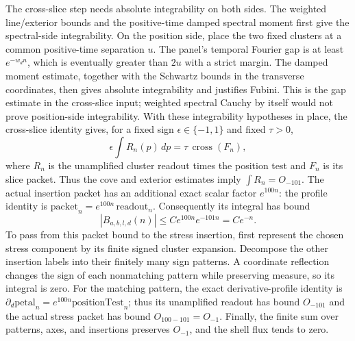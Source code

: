 The cross-slice step needs absolute integrability on both sides.  The
weighted line/exterior bounds and the positive-time damped spectral moment
first give the spectral-side integrability.  On the position side, place the
two fixed clusters at a common positive-time separation $u$.  The panel's
temporal Fourier gap is at least $e^{-w_dn}$, which is eventually greater
than $2u$ with a strict margin.  The damped moment estimate, together with
the Schwartz bounds in the transverse coordinates, then gives absolute
integrability and justifies Fubini.  This is the gap estimate in the
cross-slice input; weighted spectral Cauchy by itself would not prove
position-side integrability.  With these integrability hypotheses in place,
the cross-slice identity gives, for a fixed sign
$\epsilon\in\{-1,1\}$ and fixed $\tau>0$,
\[
 \epsilon\int R_n(p)\,dp=\tau\,\operatorname{cross}(F_n),
\]
where $R_n$ is the unamplified cluster readout times the position test and
$F_n$ is its slice packet.  Thus the cove and exterior estimates imply
$\int R_n=O_{-101}$.
The actual insertion packet has an additional exact scalar factor
$e^{100n}$: the profile identity is
$\mathrm{packet}_n=e^{100n}\,\mathrm{readout}_n$.  Consequently its
integral has bound
\begin{equation}
 |B_{a,b,l,d}(n)|\leq C e^{100n}e^{-101n}=C e^{-n}.
\label{eq:ward-shell-budget}
\end{equation}
To pass from this packet bound to the stress insertion, first represent the chosen
stress component by its finite signed cluster expansion.  Decompose the
other insertion labels into their finitely many sign patterns.  A coordinate
reflection changes the sign of each nonmatching pattern while preserving
measure, so its integral is zero.  For the matching pattern, the exact
derivative-profile identity is
$\partial_d\mathrm{petal}_n=e^{100n}\mathrm{positionTest}_n$; thus its
unamplified readout has bound $O_{-101}$ and the actual stress packet has
bound $O_{100-101}=O_{-1}$.  Finally, the finite sum over patterns, axes,
and insertions preserves $O_{-1}$, and the shell flux tends to zero.

